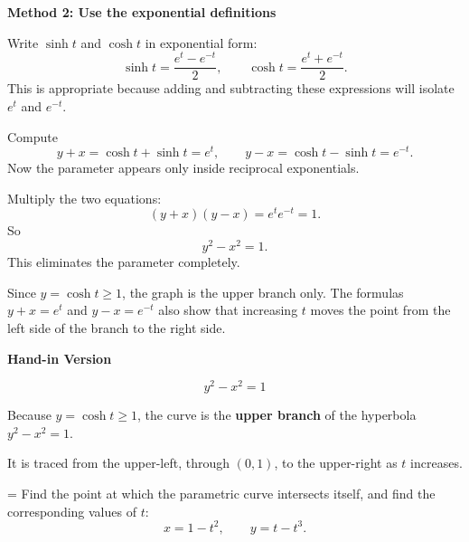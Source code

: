 \documentclass[a4paper,12pt,twocolumn]{article}
\newlength{\problemnumberwidth}
\newlength{\subproblemnumberwidth}
\newenvironment{solutionbox}{\begin{framed}}{\end{framed}}
\newcommand{\subproblem}[3]{%
  \Needspace{10\baselineskip}%
  \phantomsection\label{#1}%
  \par\vspace{0.8em}%
  \noindent
  \hangindent=\subproblemnumberwidth
  \hangafter=1
  \makebox[\subproblemnumberwidth][l]{\textbf{#2.}}#3\par
}
\begin{document}
\begin{solutionbox}
\textbf{Method 2: Use the exponential definitions}

\begin{steps}
\item Write \(\sinh t\) and \(\cosh t\) in exponential form:
\[
\sinh t=\frac{e^t-e^{-t}}{2},
\qquad
\cosh t=\frac{e^t+e^{-t}}{2}.
\]
This is appropriate because adding and subtracting these expressions will isolate \(e^t\) and \(e^{-t}\).

\item Compute
\[
y+x=\cosh t+\sinh t=e^t,
\qquad
y-x=\cosh t-\sinh t=e^{-t}.
\]
Now the parameter appears only inside reciprocal exponentials.

\item Multiply the two equations:
\[
(y+x)(y-x)=e^t e^{-t}=1.
\]
So
\[
y^2-x^2=1.
\]
This eliminates the parameter completely.

\item Since \(y=\cosh t\ge 1\), the graph is the upper branch only. The formulas \(y+x=e^t\) and \(y-x=e^{-t}\) also show that increasing \(t\) moves the point from the left side of the branch to the right side.
\end{steps}
\end{solutionbox}

\begin{solutionbox}
\textbf{Hand-in Version}

\[
\boxed{y^2-x^2=1}
\]

Because \(y=\cosh t\ge 1\), the curve is the \textbf{upper branch} of the hyperbola \(y^2-x^2=1\).

It is traced from the upper-left, through \((0,1)\), to the upper-right as \(t\) increases.
\end{solutionbox}

\subproblem{prob:10-1-57a}{57(a)}{Find the point at which the parametric curve intersects itself, and find the corresponding values of \(t\):
\[
x=1-t^2,\qquad y=t-t^3.
\]}
\end{document}
